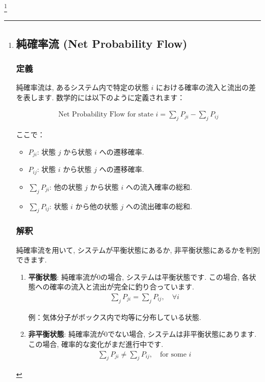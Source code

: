 \documentclass[a4j]{jsarticle}
\begin{document}
\footnote{

	\subsection*{純確率流 (Net Probability Flow)}

	\subsubsection*{定義}
	純確率流は, あるシステム内で特定の状態 \(i\) における確率の流入と流出の差を表します.
	数学的には以下のように定義されます：

	\begin{align*}
		\text{Net Probability Flow for state } i = \sum_{j} P_{ji} - \sum_{j} P_{ij}
	\end{align*}

	ここで：
	\begin{itemize}
		\item \(P_{ji}\): 状態 \(j\) から状態 \(i\) への遷移確率.
		\item \(P_{ij}\): 状態 \(i\) から状態 \(j\) への遷移確率.
		\item \(\sum_{j} P_{ji}\): 他の状態 \(j\) から状態 \(i\) への流入確率の総和.
		\item \(\sum_{j} P_{ij}\): 状態 \(i\) から他の状態 \(j\) への流出確率の総和.
	\end{itemize}

	\subsubsection*{解釈}
	純確率流を用いて, システムが平衡状態にあるか, 非平衡状態にあるかを判別できます.

	\begin{enumerate}
		\item \textbf{平衡状態}:
		      純確率流が0の場合, システムは平衡状態です. この場合, 各状態への確率の流入と流出が完全に釣り合っています.
		      \begin{align*}
			      \sum_{j} P_{ji} = \sum_{j} P_{ij}, \quad \forall i
		      \end{align*}

		      例：気体分子がボックス内で均等に分布している状態.

		\item \textbf{非平衡状態}:
		      純確率流が0でない場合, システムは非平衡状態にあります. この場合, 確率的な変化がまだ進行中です.
		      \begin{align*}
			      \sum_{j} P_{ji} \neq \sum_{j} P_{ij}, \quad \text{for some } i
		      \end{align*}


\end{enumerate}}
\end{document}
